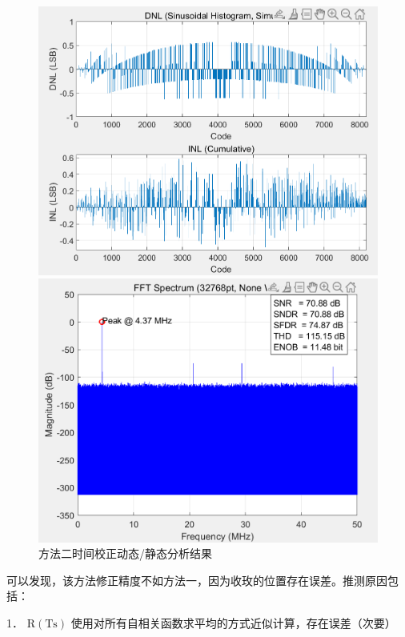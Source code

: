 \documentclass[cs4size,a4paper]{ctexart}
\numberwithin{equation}{section}
\numberwithin{table}{section}
\numberwithin{figure}{section}
\begin{document}
			\begin{figure}[H]
				\centering
				\begin{minipage}{0.49\linewidth}
					\centering
					\includegraphics[width=0.9\linewidth]{figure/cor3.png}
				\end{minipage}
				\begin{minipage}{0.49\linewidth}
					\centering
					\includegraphics[width=0.9\linewidth]{figure/cor4.png}
				\end{minipage}
				\caption{方法二时间校正动态/静态分析结果} 
				\label{fig:cor34}
			\end{figure}
			
		可以发现，该方法修正精度不如方法一，因为收玫的位置存在误差。推测原因包括：
		
		1． $\mathrm{R}(\mathrm{Ts})$ 使用对所有自相关函数求平均的方式近似计算，存在误差（次要）
		
\end{document}
